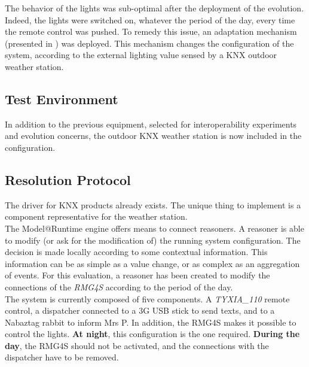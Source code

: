 The behavior of the lights was sub-optimal after the deployment of the evolution. Indeed, the lights were switched on, whatever the period of the day, every time the remote control was pushed. To remedy this issue, an adaptation mechanism (presented in \cite{Nain10a}) was deployed. This mechanism changes the configuration of the system, according to the external lighting value sensed by a KNX outdoor weather station.

\subsection{Test Environment}

In addition to the previous equipment, selected for interoperability experiments and evolution concerns, the outdoor KNX weather station is now included in the configuration.

\subsection{Resolution Protocol}

The driver for KNX products already exists. The unique thing to implement is a component representative for the weather station.\\

The Model@Runtime engine offers means to connect reasoners. A reasoner is able to modify (or ask for the modification of) the running system configuration. The decision is made locally according to some contextual information. This information can be as simple as a value change, or as complex as an aggregation of events.
For this evaluation, a reasoner has been created to modify the connections of the {\it RMG4S} according to the period of the day.\\

The system is currently composed of five components. A {\it TYXIA\_110} remote control, a dispatcher connected to a 3G USB stick to send texts, and to a Nabaztag rabbit to inform Mrs P. In addition, the RMG4S makes it possible to control the lights. {\bf At night}, this configuration is the one required. {\bf During the day}, the RMG4S should not be activated, and the connections with the dispatcher have to be removed.\\

